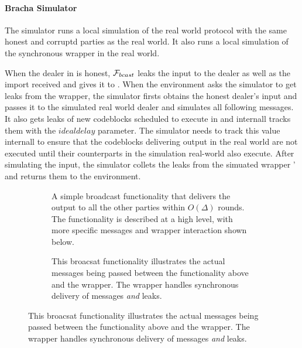 \paragraph{Bracha Simulator}
The simulator runs a local simulation of the real world protocol with the same honest and corruptd parties as the real world. It also runs a local simulation of the synchronous wrapper in the real world.

When the dealer in is honest, $\mathcal{F}_{bcast}$ leaks the input to the dealer as well as the import received and gives it to \Wsync.
When the environment asks the simulator to get leaks from the wrapper, the simulator firsts obtains the honest dealer's input and passes it to the simulated real world dealer and simulates all following messages.
It also gets leaks of new codeblocks scheduled to execute in \Wsync and internall tracks them with the $idealdelay$ parameter. 
The simulator needs to track this value internall to ensure that the codeblocks delivering output in the real world are not executed until their counterparts in the simulation real-world also execute.
After simulating the input, the simulator collets the leaks from the simuated wrapper \Wsync' and returns them to the environment.


\begin{figure}
\begin{subfigure}{\textwidth}
	
	\label{fig:functionality:broadcast_import}
	\caption{A simple broadcast functionality that delivers the output to all the other parties within $O(\Delta)$ rounds. The functionality is described at a high level, with more specific messages and wrapper interaction shown below.}
\end{subfigure}
\newline
\begin{subfigure}{\textwidth}
	
	\label{fig:functionality:broadcast_import_real}
	\caption{This broacsat functionality illustrates the actual messages being passed between the functionality above and the wrapper. The wrapper handles synchronous delivery of messages {\em and} leaks.}
\end{subfigure}
\end{figure}

\begin{figure}
	
	\label{fig:prot:bracha_ours}
\end{figure}

\begin{figure}
	
	\label{fig:sim:bracha_ours}
\end{figure}


